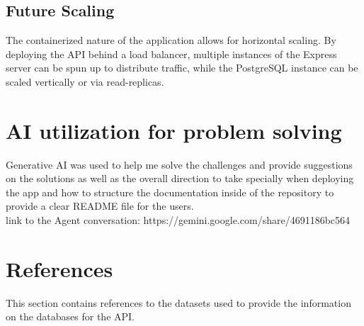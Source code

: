 \documentclass[11pt,a4paper]{article}
\begin{document}
\subsection{Future Scaling}

The containerized nature of the application allows for horizontal scaling. By deploying the API behind a load balancer, multiple instances of the Express server can be spun up to distribute traffic, while the PostgreSQL instance can be scaled vertically or via read-replicas.

\section{AI utilization for problem solving}

Generative AI was used to help me solve the challenges and provide suggestions on the solutions as well as the overall direction to take specially when deploying the app and how to structure the documentation inside of the repository to provide a clear README file for the users. \\

\noindent link to the Agent conversation: https://gemini.google.com/share/4691186bc564

\section{References}

This section contains references to the datasets used to provide the information on the databases for the API.\\
\end{document}
